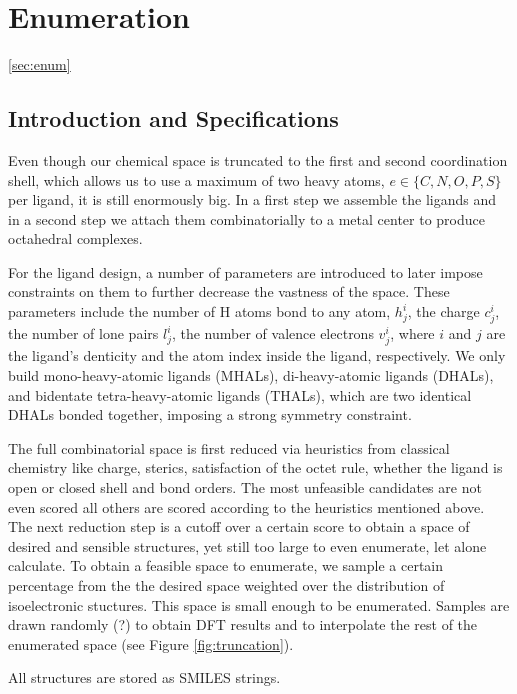 \section{Enumeration}
\ref{sec:enum}
\subsection{Introduction and Specifications}
Even though our chemical space is truncated to the first and second coordination shell, which allows us to use a maximum of two heavy atoms, $e \in \{C,N,O,P,S\} $ per ligand, it is still enormously big. In a first step we assemble the ligands and in a second step we attach them combinatorially to a metal center to produce octahedral complexes. 

For the ligand design, a number of parameters are introduced to later impose constraints on them to further decrease the vastness of the space. These parameters include the number of H atoms bond to any atom, $h^i_j$, the charge $c^i_j$, the number of lone pairs $l^i_j$, the number of valence electrons $v^i_j$, where $i$ and $j$ are the ligand's denticity and the atom index inside the ligand, respectively. We only build mono-heavy-atomic ligands (MHALs), di-heavy-atomic ligands (DHALs), and bidentate tetra-heavy-atomic ligands (THALs), which are two identical DHALs bonded together, imposing a strong symmetry constraint.

The full combinatorial space is first reduced via heuristics from classical chemistry like charge, sterics, satisfaction of the octet rule, whether the ligand is open or closed shell and bond orders. The most unfeasible candidates are not even scored all others are scored according to the heuristics mentioned above. The next reduction step is a cutoff over a certain score to obtain a space of desired and sensible structures, yet still too large to even enumerate, let alone calculate. To obtain a feasible space to enumerate, we sample a certain percentage from the the desired space weighted over the distribution of isoelectronic stuctures. This space is small enough to be enumerated. Samples are drawn randomly (?) to obtain DFT results and to interpolate the rest of the enumerated space (see Figure \ref{fig:truncation}).

All structures are stored as SMILES strings. 
 
